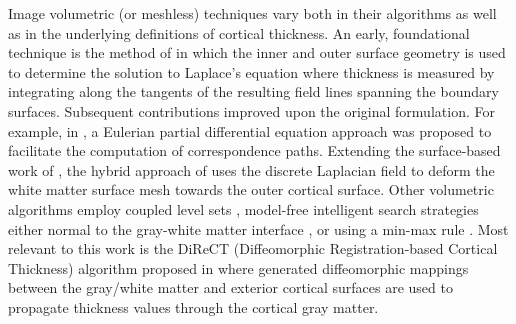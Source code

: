 Image volumetric (or meshless) techniques vary both in their algorithms as well as
in the underlying definitions of cortical thickness.  An early, foundational technique is the
method of \cite{jones2000} in which the inner and outer surface geometry is used to determine the
solution to Laplace's equation where thickness is measured by integrating along the 
tangents of the resulting field lines spanning the boundary surfaces.  Subsequent contributions
improved upon the original formulation.  For example, in \cite{yezzi2003}, a Eulerian partial differential equation approach
was proposed to facilitate the computation of correspondence paths.  Extending the surface-based
work of \cite{macdonald2000}, the hybrid approach of
\cite{kim2005} uses the discrete Laplacian field to deform the white matter surface mesh towards the 
outer cortical surface.    
Other volumetric algorithms employ coupled
level sets \citep{zeng1999}, model-free intelligent search strategies either normal to 
the gray-white matter interface \citep{scott2009}, or using a min-max rule \citep{clement-vachet2011}.
Most relevant to this work is the DiReCT (Diffeomorphic Registration-based 
Cortical Thickness) algorithm proposed in \cite{das2009} where generated
diffeomorphic mappings between the 
gray/white matter and exterior cortical surfaces are used to propagate thickness values
through the cortical gray matter.  


